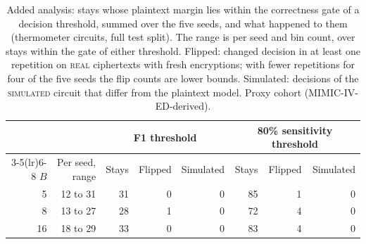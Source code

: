 \begin{table}[t]
\centering
\caption{Added analysis: stays whose plaintext margin lies within the correctness gate of a decision threshold, summed over the five seeds, and what happened to them (thermometer circuits, full test split). The range is per seed and bin count, over stays within the gate of either threshold. Flipped: changed decision in at least one repetition on \textsc{real} ciphertexts with fresh encryptions; with fewer repetitions for four of the five seeds the flip counts are lower bounds. Simulated: decisions of the \textsc{simulated} circuit that differ from the plaintext model. Proxy cohort (MIMIC-IV-ED-derived).}
\label{tab:t19_near_threshold}
\begin{tabular}{rrrrrrrr}
\toprule
 & & \multicolumn{3}{c}{F1 threshold} & \multicolumn{3}{c}{80\% sensitivity threshold} \\
\cmidrule(lr){3-5}\cmidrule(lr){6-8}
$B$ & Per seed, range & Stays & Flipped & Simulated & Stays & Flipped & Simulated \\
\midrule
5 & 12 to 31 & 31 & 0 & 0 & 85 & 1 & 0 \\
8 & 13 to 27 & 28 & 1 & 0 & 72 & 4 & 0 \\
16 & 18 to 29 & 33 & 0 & 0 & 83 & 4 & 0 \\
\bottomrule
\end{tabular}
\end{table}
